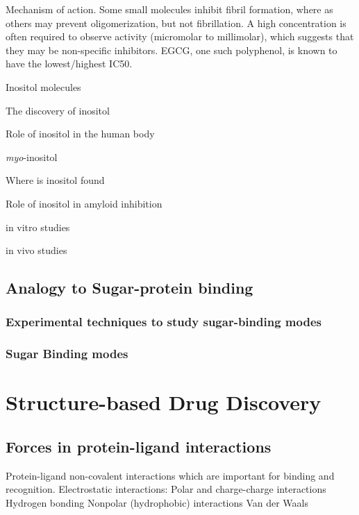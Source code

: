 \begin{outline}[enumerate]
    	\2 Mechanism of action. Some small molecules inhibit fibril formation, where as others may prevent oligomerization, but not fibrillation. A high concentration is often required to observe activity (micromolar to millimolar), which suggests that they may be non-specific inhibitors. EGCG, one such polyphenol, is known to have the lowest/highest IC50.
	
	\1 Inositol molecules
	
		\2 The discovery of inositol
		
		\2 Role of inositol in the human body 
		
			\3 \emph{myo}-inositol
			
		\2 Where is inositol found
		
		\2 Role of inositol in amyloid inhibition
		
			\3 in vitro studies
			
			\3 in vivo studies
\end{outline}

\subsection{Analogy to Sugar-protein binding}
\subsubsection{Experimental techniques to study sugar-binding modes}
\subsubsection{Sugar Binding modes}


\section{Structure-based Drug Discovery}
\subsection{Forces in protein-ligand interactions}
\begin{outline}
	\1 Protein-ligand non-covalent interactions which are important for binding and recognition.
		\2 Electrostatic interactions: Polar and charge-charge interactions
			\3 Hydrogen bonding
		\2 Nonpolar (hydrophobic) interactions
		  \3 Van der Waals
\end{outline}

